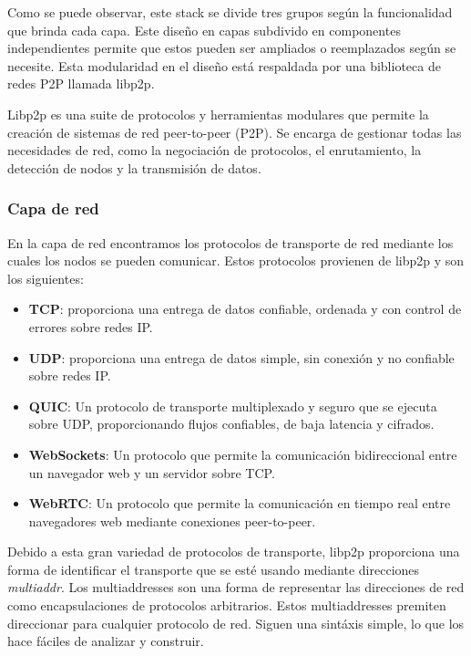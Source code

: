 Como se puede observar, este stack se divide tres grupos según la funcionalidad que brinda cada capa.
Este diseño en capas subdivido en componentes independientes permite que estos pueden ser ampliados o reemplazados
según se necesite. Esta modularidad en el diseño está respaldada por una biblioteca de redes P2P llamada libp2p\cite{WhatLibp2p}.

Libp2p es una suite de protocolos y herramientas modulares que permite la creación de sistemas de red peer-to-peer (P2P). Se encarga de gestionar todas las necesidades de red, como la negociación de protocolos, el enrutamiento, la detección de nodos y la transmisión de datos.

\subsubsection{Capa de red}
En la capa de red encontramos los protocolos de transporte de red mediante los cuales los nodos se pueden comunicar. Estos protocolos provienen de libp2p\cite{labsLibp2pConnectivity} y son los siguientes:
\begin{itemize}[itemsep=1pt,nolistsep]
      \item \textbf{TCP}: proporciona una entrega de datos confiable, ordenada y con control de errores sobre redes IP.
      \item \textbf{UDP}: proporciona una entrega de datos simple, sin conexión y no confiable sobre redes IP.
      \item \textbf{QUIC}: Un protocolo de transporte multiplexado y seguro que se ejecuta sobre UDP, proporcionando flujos confiables, de baja latencia y cifrados.
      \item \textbf{WebSockets}: Un protocolo que permite la comunicación bidireccional entre un navegador web y un servidor sobre TCP.
      \item \textbf{WebRTC}: Un protocolo que permite la comunicación en tiempo real entre navegadores web mediante conexiones peer-to-peer.
\end{itemize}

Debido a esta gran variedad de protocolos de transporte, libp2p proporciona una forma de identificar el transporte que se esté usando mediante
direcciones \textit{multiaddr}.
Los multiaddresses son una forma de representar las direcciones de red como encapsulaciones de protocolos arbitrarios. Estos multiaddresses premiten direccionar
para cualquier protocolo de red. Siguen una sintáxis  simple, lo que los hace fáciles de analizar y construir.

